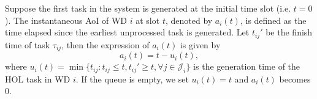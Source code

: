 \documentclass[lettersize, journal]{IEEEtran}
\begin{document}

Suppose the first task in the system is generated at the initial time slot (i.e. $t=0$).
The instantaneous AoI of WD $i$ at slot $t$, denoted by $a_i(t)$, is defined as the time elapsed since the earliest unprocessed task is generated.
Let $t_{ij}'$ be the finish time of task $\tau_{ij}$,
then the expression of $a_i(t)$ is given by
\begin{equation*}
    a_i(t) = t - u_i(t),
\end{equation*}
where $u_i(t) = \min \{ t_{ij} : t_{ij} \leq t, t_{ij}' \geq t, \forall j\in\mathcal{J}_i \}$ is the generation time of the HOL task in WD $i$.
If the queue is empty, we set $u_i(t) = t$ and $a_i(t)$ becomes $0$.
\end{document}
